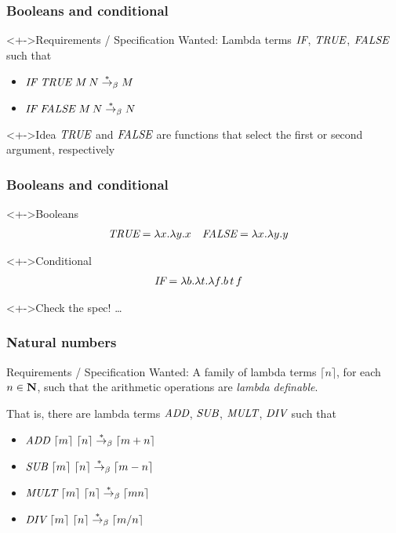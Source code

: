 \documentclass[pdftex,aspectratio=169]{beamer}
\begin{document}
\begin{frame}[fragile]
  \frametitle{Booleans and conditional}
  \begin{exampleblock}<+->{Requirements / Specification}
    Wanted: Lambda terms $\textit{IF}$, $\textit{TRUE}$, $\textit{FALSE}$ such that
    \begin{itemize}
    \item $\textit{IF}~\textit{TRUE}~M\,N \stackrel\ast\rightarrow_\beta M$
    \item $\textit{IF}~\textit{FALSE}~M\,N \stackrel\ast\rightarrow_\beta N$
    \end{itemize}
  \end{exampleblock}
  \begin{exampleblock}<+->{Idea}
    $\textit{TRUE}$ and $\textit{FALSE}$ are functions that select the first or second
    argument, respectively
  \end{exampleblock}
  \end{frame}

\begin{frame}
  \frametitle{Booleans and conditional}
  \begin{block}<+->{Booleans}\VSPBLS
    \begin{align*}
      \textit{TRUE} &= \lambda x.\lambda y.x &
      \textit{FALSE} &= \lambda x.\lambda y.y
    \end{align*}
  \end{block}
  \begin{block}<+->{Conditional}\VSPBLS
    \begin{align*}
      \textit{IF} &= \lambda b.\lambda t.\lambda f. b\,t\,f
    \end{align*}
  \end{block}
  \begin{alertblock}<+->{Check the spec!}
    \dots
  \end{alertblock}
\end{frame}


\begin{frame}[fragile]
  \frametitle{Natural numbers}
  \begin{exampleblock}{Requirements / Specification}
    Wanted: A family of lambda terms $\lceil n\rceil$, for each
    $n\in\mathbf{N}$, such that the arithmetic operations are \emph{lambda
      definable}.

    That is, there are lambda terms $\textit{ADD}$, $\textit{SUB}$, $\textit{MULT}$, $\textit{DIV}$ such that
    \begin{itemize}
    \item $\textit{ADD}~\lceil m\rceil~\lceil n\rceil \stackrel\ast\rightarrow_\beta \lceil m+n\rceil$
    \item $\textit{SUB}~\lceil m\rceil~\lceil n\rceil \stackrel\ast\rightarrow_\beta \lceil m-n\rceil$
    \item $\textit{MULT}~\lceil m\rceil~\lceil n\rceil \stackrel\ast\rightarrow_\beta \lceil mn\rceil$
    \item $\textit{DIV}~\lceil m\rceil~\lceil n\rceil \stackrel\ast\rightarrow_\beta \lceil m/n\rceil$
    \end{itemize}
  \end{exampleblock}
\end{frame}
\end{document}
